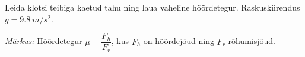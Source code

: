 Leida klotsi teibiga kaetud tahu ning laua vaheline hõõrdetegur.
Raskuskiirendus $g = \SI{9,8}{m/s^2}$.

\textit{Märkus:} Hõõrdetegur $\mu = \dfrac{F_h}{F_r}$, kus $F_h$ on hõõrdejõud
ning $F_r$ rõhumisjõud.
